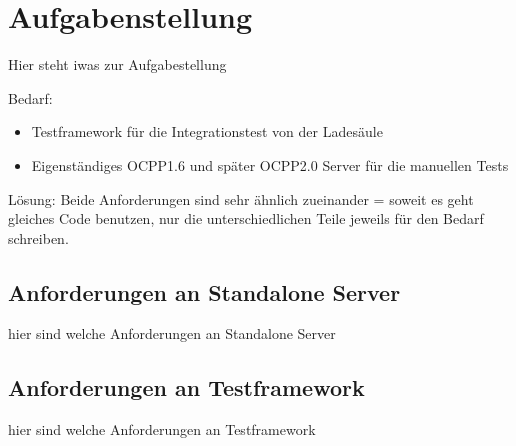 \section{Aufgabenstellung}

Hier steht iwas zur Aufgabestellung

Bedarf:
\begin{itemize}
    \item Testframework für die Integrationstest von der Ladesäule
    \item Eigenständiges OCPP1.6 und später OCPP2.0 Server für die manuellen Tests
\end{itemize}

Lösung:
Beide Anforderungen sind sehr ähnlich zueinander =\> soweit es geht gleiches Code benutzen, nur die unterschiedlichen Teile jeweils für den Bedarf schreiben.

\subsection{Anforderungen an Standalone Server}

hier sind welche Anforderungen an Standalone Server

\subsection{Anforderungen an Testframework }

hier sind welche Anforderungen an Testframework

